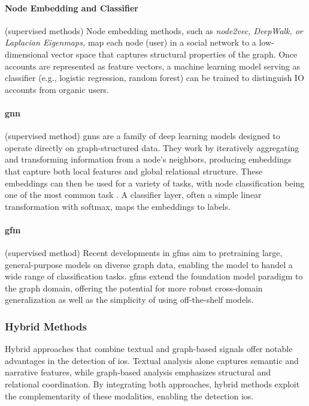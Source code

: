 \documentclass{article}
\begin{document}
\paragraph{Node Embedding and Classifier} (supervised methods) Node embedding methods, such as \textit{node2vec, DeepWalk, or Laplacian Eigenmaps,} map each node (user) in a social network to a low-dimensional vector space that captures structural properties of the graph. Once accounts are represented as feature vectors, a machine learning model serving as classifier (e.g., logistic regression, random forest) can be trained to distinguish IO accounts from organic users. \cite{Inductive2023graphLearning, mannocci2024detection}

\paragraph{\Ac{gnn}} (supervised method) \Acp{gnn} are a family of deep learning models designed to operate directly on graph-structured data. They work by iteratively aggregating and transforming information from a node’s neighbors, producing embeddings that capture both local features and global relational structure. These embeddings can then be used for a variety of tasks, with node classification being one of the most common task . A classifier layer, often a simple linear transformation with softmax, maps the embeddings to labels. \cite{GNN2022classification}

\paragraph{\Ac{gfm}} (supervised method) Recent developments in \acp{gfm} aim to pretraining large, general-purpose models on diverse graph data, enabling the model to handel a wide range of classification tasks. \acp{gfm} extend the foundation model paradigm to the graph domain, offering the potential for more robust cross-domain generalization as well as the simplicity of using off-the-shelf models. \cite{liu2025GFM, oneGraphModel2023classification}

\subsubsection{Hybrid Methods}

Hybrid approaches that combine textual and graph-based signals offer notable advantages in the detection of \acp{io}. Textual analysis alone captures semantic and narrative features, while graph-based analysis emphasizes structural and relational coordination. By integrating both approaches, hybrid methods exploit the complementarity of these modalities, enabling the detection \acp{io}. \cite{Inductive2023graphLearning, brugere2018network, minici2025iohunter, LLM2024IOdetecttion}
\end{document}
